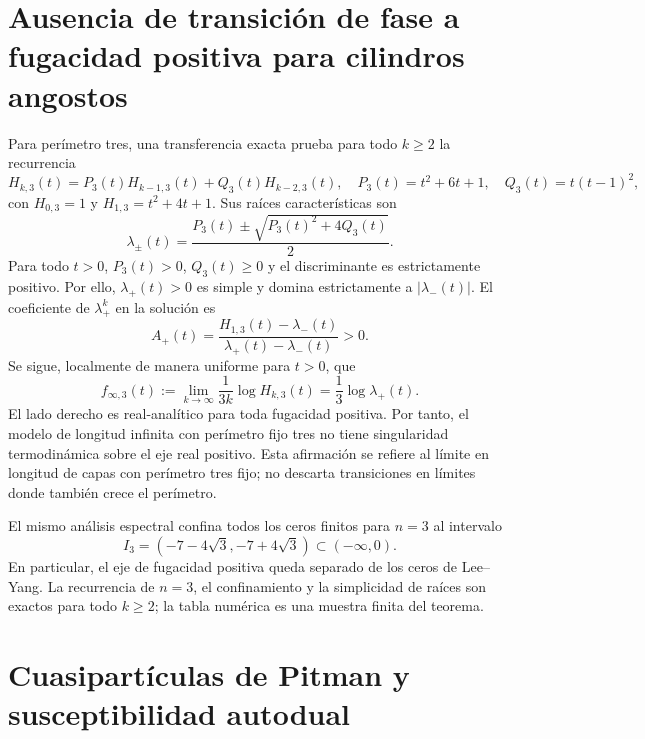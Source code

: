 \documentclass[11pt]{article}
\begin{document}
\section{Ausencia de transición de fase a fugacidad positiva para cilindros angostos}

Para perímetro tres, una transferencia exacta prueba para todo $k\ge2$ la recurrencia
\begin{equation}
  H_{k,3}(t)=P_3(t)H_{k-1,3}(t)+Q_3(t)H_{k-2,3}(t),
  \quad P_3(t)=t^2+6t+1,\quad Q_3(t)=t(t-1)^2,
  \label{eq:es-n3-recurrence}
\end{equation}
con $H_{0,3}=1$ y $H_{1,3}=t^2+4t+1$. Sus raíces características son
\begin{equation}
  \lambda_\pm(t)=\frac{P_3(t)\pm\sqrt{P_3(t)^2+4Q_3(t)}}{2}.
  \label{eq:es-n3-eigenvalues}
\end{equation}
Para todo $t>0$, $P_3(t)>0$, $Q_3(t)\ge0$ y el discriminante es estrictamente positivo. Por ello, $\lambda_+(t)>0$ es simple y domina estrictamente a $|\lambda_-(t)|$. El coeficiente de $\lambda_+^k$ en la solución es
\[
  A_+(t)=\frac{H_{1,3}(t)-\lambda_-(t)}{\lambda_+(t)-\lambda_-(t)}>0.
\]
Se sigue, localmente de manera uniforme para $t>0$, que
\begin{equation}
  f_{\infty,3}(t):=\lim_{k\to\infty}\frac{1}{3k}\log H_{k,3}(t)
  =\frac13\log\lambda_+(t).
  \label{eq:es-free-energy-limit}
\end{equation}
El lado derecho es real-analítico para toda fugacidad positiva. Por tanto, el modelo de longitud infinita con perímetro fijo tres no tiene singularidad termodinámica sobre el eje real positivo. Esta afirmación se refiere al límite en longitud de capas con perímetro tres fijo; no descarta transiciones en límites donde también crece el perímetro.

El mismo análisis espectral confina todos los ceros finitos para $n=3$ al intervalo
\begin{equation}
  I_3=(-7-4\sqrt3,-7+4\sqrt3)\subset(-\infty,0).
  \label{eq:es-i3}
\end{equation}
En particular, el eje de fugacidad positiva queda separado de los ceros de Lee--Yang. La recurrencia de $n=3$, el confinamiento y la simplicidad de raíces son exactos para todo $k\ge2$; la tabla numérica es una muestra finita del teorema.

\section{Cuasipartículas de Pitman y susceptibilidad autodual}
\end{document}
